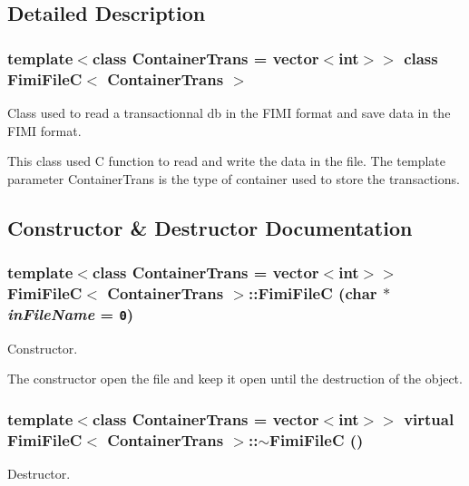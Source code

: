 \subsection{Detailed Description}
\subsubsection*{template$<$class Container\-Trans = vector$<$int$>$$>$ class Fimi\-File\-C$<$ Container\-Trans $>$}

Class used to read a transactionnal db in the FIMI format and save data in the FIMI format. 

This class used C function to read and write the data in the file. The template parameter Container\-Trans is the type of container used to store the transactions. 



\subsection{Constructor \& Destructor Documentation}
\subsubsection{\setlength{\rightskip}{0pt plus 5cm}template$<$class Container\-Trans = vector$<$int$>$$>$ {\bf Fimi\-File\-C}$<$ Container\-Trans $>$::{\bf Fimi\-File\-C} (char $\ast$ {\em in\-File\-Name} = {\tt 0})\hspace{0.3cm}{\tt  [inline]}}\label{class_fimi_file_c_cf090313520a7f63261dc52dfbdac38e}


Constructor. 

The constructor open the file and keep it open until the destruction of the object. 
\subsubsection{\setlength{\rightskip}{0pt plus 5cm}template$<$class Container\-Trans = vector$<$int$>$$>$ virtual {\bf Fimi\-File\-C}$<$ Container\-Trans $>$::$\sim${\bf Fimi\-File\-C} ()\hspace{0.3cm}{\tt  [inline, virtual]}}\label{class_fimi_file_c_a9ba02b80a86e9c08c48e1b40b999d52}


Destructor. 

